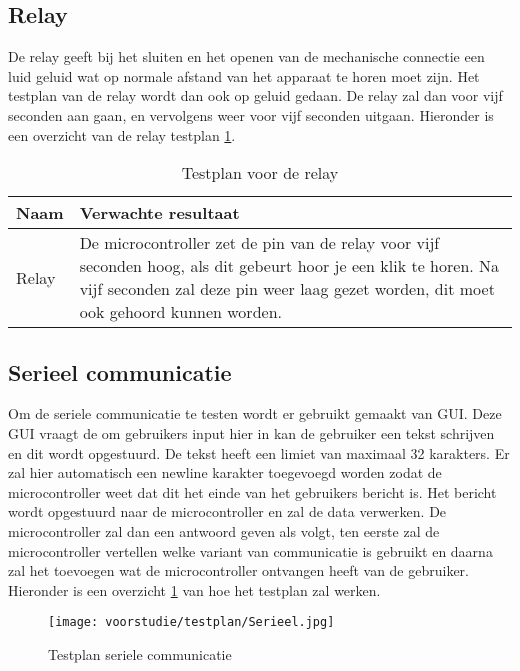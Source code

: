 \subsection{Relay}
De relay geeft bij het sluiten en het openen van de mechanische connectie een luid geluid wat op normale afstand van het apparaat te horen moet zijn. Het testplan van de relay wordt dan ook op geluid gedaan. De relay zal dan voor vijf seconden aan gaan, en vervolgens weer voor vijf seconden uitgaan. Hieronder is een overzicht van de relay testplan \ref{tab:hw_val_relay_testplan}.

\begin{table}[h!]
	\caption{Testplan voor de relay}
	\begin{tabular}{lp{14.5cm}}
	\toprule
	\textbf{Naam} 	& \textbf{Verwachte resultaat} \\ \toprule
	Relay			& De microcontroller zet de pin van de relay voor vijf seconden hoog, als dit gebeurt hoor je een klik te horen. Na vijf seconden zal deze pin weer laag gezet worden, dit moet ook gehoord kunnen worden.\\  \bottomrule
	\end{tabular}
	\label{tab:hw_val_relay_testplan}
\end{table}


\subsection{Serieel communicatie}
Om de seriele communicatie te testen wordt er gebruikt gemaakt van GUI. Deze GUI vraagt de om gebruikers input hier in kan de gebruiker een tekst schrijven en dit wordt opgestuurd. De tekst heeft een limiet van maximaal 32 karakters. Er zal hier automatisch een newline karakter toegevoegd worden zodat de microcontroller weet dat dit het einde van het gebruikers bericht is. Het bericht wordt opgestuurd naar de microcontroller en zal de data verwerken. De microcontroller zal dan een antwoord geven als volgt, ten eerste zal de microcontroller vertellen welke variant van communicatie is gebruikt en daarna zal het toevoegen wat de microcontroller ontvangen heeft van de gebruiker. Hieronder is een overzicht \ref{fig:testplanserieel} van hoe het testplan zal werken.

\begin{figure}[h!]
	\centering
	\caption{Testplan seriele communicatie}
	\label{fig:testplanserieel}
	\texttt{[image: voorstudie/testplan/Serieel.jpg]}
\end{figure}

